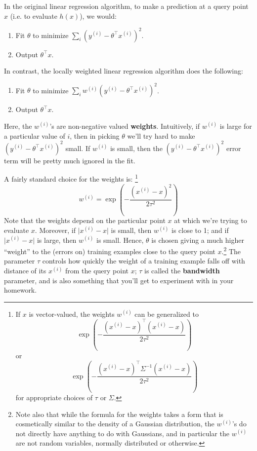 In the original linear regression algorithm, to make a prediction at a query
point $x$ (i.e. to evaluate $h(x)$), we would: %
\begin{enumerate}
    \item Fit $\theta$ to minimize $\sum_i \left( y^{(i)} - \theta^\top x^{(i)} \right)^2$.
    \item Output $\theta^\top x$.
\end{enumerate}

In contrast, the locally weighted linear regression algorithm does the following:
\begin{enumerate}
    \item Fit $\theta$ to minimize $\sum_i w^{(i)} \left(y^{(i)} - \theta^\top x^{(i)} \right)^2$.
    \item Output $\theta^\top x$.
\end{enumerate}

Here, the $w^{(i)}$'s are non-negative valued \textbf{weights}. Intuitively, if $w^{(i)}$ is large
for a particular value of $i$, then in picking $\theta$ we'll try hard to make $(y^{(i)} - \theta^\top x^{(i)})^2$ small.
If $w^{(i)}$ is small, then the $(y^{(i)} - \theta^\top x^{(i)})^2$ error term will be
pretty much ignored in the fit.

A fairly standard choice for the weights is:%
\footnote{If $x$ is vector-valued, the weights $w^{(i)}$ can be generalized to
\[\exp \left( - \frac{(x^{(i)} - x)^\top (x^{(i)} - x)}{2\tau^2} \right)\]
or
\[\exp \left( - \frac{(x^{(i)} - x)^\top \Sigma^{-1} (x^{(i)} - x)}{2\tau^2} \right)\]
for appropriate choices of $\tau$ or $\Sigma$.}
\begin{equation}
    w^{(i)} = \exp \left( - \frac{(x^{(i)} - x)^2}{2\tau^2} \right)
\end{equation}
Note that the weights depend on the particular point $x$ at which we're trying
to evaluate $x$. Moreover, if $\lvert x^{(i)} - x \rvert$ is small, then $w^{(i)}$ is close to 1; and
if $\lvert x^{(i)} - x \rvert$ is large, then $w^{(i)}$ is small. Hence, $\theta$ is chosen giving a much
higher ``weight'' to the (errors on) training examples close to the query point
$x$.\footnote{Note also that while the formula for the weights takes a form that is
cosmetically similar to the density of a Gaussian distribution, the $w^{(i)}$'s do
not directly have anything to do with Gaussians, and in particular the $w^{(i)}$
are not random variables, normally distributed or otherwise.} %
The parameter $\tau$ controls how quickly the weight of a training example falls off with distance
of its $x^{(i)}$ from the query point $x$; $\tau$ is called the \textbf{bandwidth} parameter, and
is also something that you'll get to experiment with in your homework.

